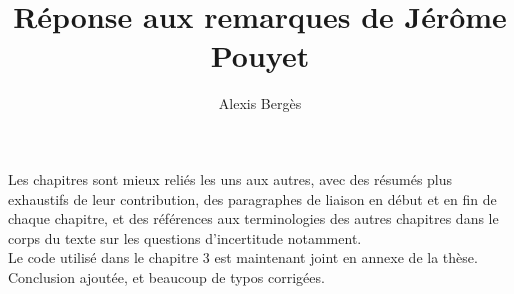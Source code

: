 \documentclass{article}
\begin{document}
\title{Réponse aux remarques de Jérôme Pouyet}
\author{Alexis Bergès}

\maketitle

Les chapitres sont mieux reliés les uns aux autres, avec des résumés plus exhaustifs de leur contribution, des paragraphes de liaison en début et en fin de chaque chapitre, et des références aux terminologies des autres chapitres dans le corps du texte sur les questions d'incertitude notamment.\\

Le code utilisé dans le chapitre 3 est maintenant joint en annexe de la thèse.\\

Conclusion ajoutée, et beaucoup de typos corrigées.\\
\end{document}

